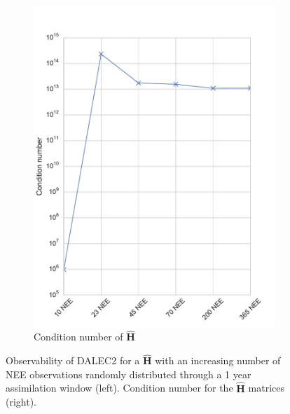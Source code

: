 \documentclass[11pt]{article}
\begin{document}
\begin{figure}[ht]
    \begin{subfigure}[b]{0.4\textwidth}
        \includegraphics[width=\textwidth]{dalec2_obsrankcondwind.pdf}
        \caption{Condition number of $\hat{\textbf{H}}$}
        \label{fig:D2_observabilitycondwind}
    \end{subfigure}
    \caption{Observability of DALEC2 for a $\hat{\textbf{H}}$ with an increasing number of NEE observations randomly distributed through a 1 year assimilation window (left). Condition number for the $\hat{\textbf{H}}$ matrices (right).}
    \label{fig:D2_observabilitywind}
\end{figure}
\end{document}
